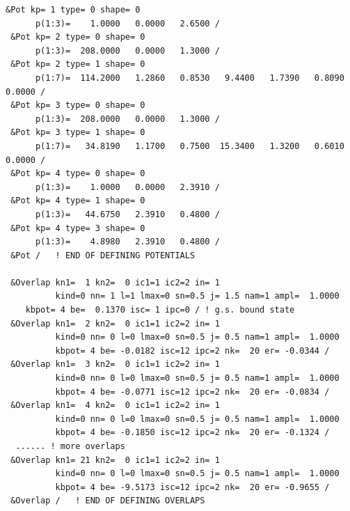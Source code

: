 \documentclass[11pt]{book}
\begin{document}
\begin{small}
\begin{lstlisting}[frame=single]
 &Pot kp= 1 type= 0 shape= 0                                                    
      p(1:3)=    1.0000   0.0000   2.6500 /                                     
 &Pot kp= 2 type= 0 shape= 0                                                    
      p(1:3)=  208.0000   0.0000   1.3000 /                                     
 &Pot kp= 2 type= 1 shape= 0                                                    
      p(1:7)=  114.2000   1.2860   0.8530   9.4400   1.7390   0.8090   0.0000 / 
 &Pot kp= 3 type= 0 shape= 0                                                    
      p(1:3)=  208.0000   0.0000   1.3000 /                                     
 &Pot kp= 3 type= 1 shape= 0                                                    
      p(1:7)=   34.8190   1.1700   0.7500  15.3400   1.3200   0.6010   0.0000 / 
 &Pot kp= 4 type= 0 shape= 0                                                    
      p(1:3)=    1.0000   0.0000   2.3910 /                                     
 &Pot kp= 4 type= 1 shape= 0                                                    
      p(1:3)=   44.6750   2.3910   0.4800 /                                     
 &Pot kp= 4 type= 3 shape= 0                                                    
      p(1:3)=    4.8980   2.3910   0.4800 /                                     
 &Pot /   ! END OF DEFINING POTENTIALS                                          
                                                                                
 &Overlap kn1=  1 kn2=  0 ic1=1 ic2=2 in= 1                                     
          kind=0 nn= 1 l=1 lmax=0 sn=0.5 j= 1.5 nam=1 ampl=  1.0000             
    kbpot= 4 be=  0.1370 isc= 1 ipc=0 / ! g.s. bound state
 &Overlap kn1=  2 kn2=  0 ic1=1 ic2=2 in= 1                                     
          kind=0 nn= 0 l=0 lmax=0 sn=0.5 j= 0.5 nam=1 ampl=  1.0000             
          kbpot= 4 be= -0.0182 isc=12 ipc=2 nk=  20 er= -0.0344 /               
 &Overlap kn1=  3 kn2=  0 ic1=1 ic2=2 in= 1                                     
          kind=0 nn= 0 l=0 lmax=0 sn=0.5 j= 0.5 nam=1 ampl=  1.0000             
          kbpot= 4 be= -0.0771 isc=12 ipc=2 nk=  20 er= -0.0834 /               
 &Overlap kn1=  4 kn2=  0 ic1=1 ic2=2 in= 1                                     
          kind=0 nn= 0 l=0 lmax=0 sn=0.5 j= 0.5 nam=1 ampl=  1.0000             
          kbpot= 4 be= -0.1850 isc=12 ipc=2 nk=  20 er= -0.1324 /               
  ...... ! more overlaps        
 &Overlap kn1= 21 kn2=  0 ic1=1 ic2=2 in= 1                                     
          kind=0 nn= 0 l=0 lmax=0 sn=0.5 j= 0.5 nam=1 ampl=  1.0000             
          kbpot= 4 be= -9.5173 isc=12 ipc=2 nk=  20 er= -0.9655 /               
 &Overlap /   ! END OF DEFINING OVERLAPS                                        
                                                                                

\end{lstlisting}
\end{small}
\end{document}
